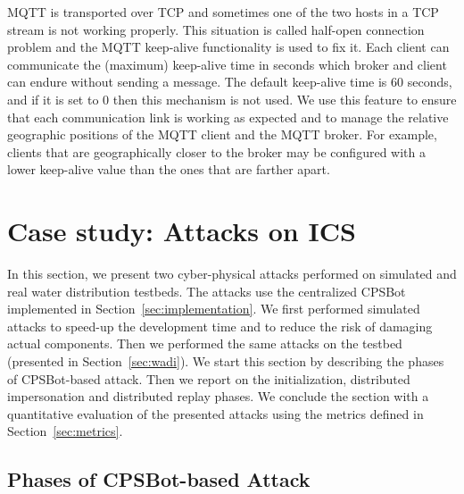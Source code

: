 \documentclass[sigconf]{acmart}
\makeatletter
\newcommand{\Paragraph}[1]{\smallskip\noindent{\bf #1.}}
\newcommand{\Botnet}{CPSBot\@\xspace}
\makeatother
\begin{document}
\Paragraph{Parametric keep-alive interval}
MQTT is transported over TCP and sometimes one of the two hosts in a TCP
stream is not working properly. This situation is called half-open connection
problem and the MQTT keep-alive functionality is used to fix it.
Each client can communicate the (maximum) keep-alive time in seconds which
broker and client can endure without sending a message. The default keep-alive
time is 60 seconds, and if it is set to 0 then this mechanism is not used.
We use this feature to ensure that each communication link is working as
expected and to manage the relative geographic positions of the MQTT client and the
MQTT broker. For example, clients that are geographically closer to the broker may
be configured with a lower keep-alive value than the ones that are farther
apart.








\section{Case study: Attacks on ICS}
\label{sec:attacks}

In this section, we present two cyber-physical attacks performed on simulated
and real water distribution testbeds. The attacks use the centralized \Botnet
implemented in Section~\ref{sec:implementation}. We first performed simulated
attacks to speed-up the development time and to reduce the risk of damaging
actual components. Then we performed the same attacks on the \wadilong testbed
(presented in Section~\ref{sec:wadi}). We start this section by describing
the phases of \Botnet-based attack. Then we report on the initialization,
distributed impersonation and distributed replay phases. We conclude the
section with a quantitative evaluation of the presented attacks using the
metrics defined in Section~\ref{sec:metrics}.

\subsection{Phases of \Botnet-based Attack}
\label{sec:attack-example}
\end{document}
